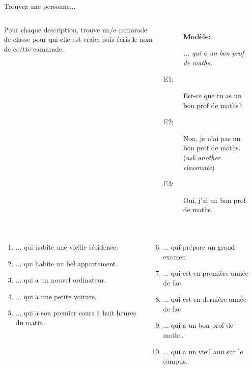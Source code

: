 \documentclass{beamer}
\begin{document}
  \begin{frame}{Trouvez une personne...}
    \begin{columns}
        Pour chaque description, trouve un/e camarade de classe pour qui elle est vraie, puis écris le nom de ce/tte camarade. \\
        {\scriptsize
        \begin{description}
          \item[] \textbf{Modèle:}
          \item[] \emph{... qui a un bon prof de maths.}
          \item[E1:] Est-ce que tu as un bon prof de maths?
          \item[E2:] Non, je n'ai pas un bon prof de maths. (\emph{ask another classmate})
          \item[E3:] Oui, j'ai un bon prof de maths.
        \end{description}
        }
    \end{columns}
    \vspace{1cm}
    {\scriptsize
    \begin{columns}[t]
        \begin{enumerate}
          \item ... qui habite une vieille résidence.
          \item ... qui habite un bel appartement.
          \item ... qui a un nouvel ordinateur.
          \item ... qui a une petite voiture.
          \item ... qui a son premier cours à huit heures du matin.
        \end{enumerate}
        \begin{enumerate}
          \setcounter{enumi}{5}
          \item ... qui prépare un grand examen.
          \item ... qui est en première année de fac.
          \item ... qui est en dernière année de fac.
          \item ... qui a un bon prof de maths.
          \item ... qui a un vieil ami sur le campus.
        \end{enumerate}
    \end{columns}
    }
  \end{frame}
\end{document}
